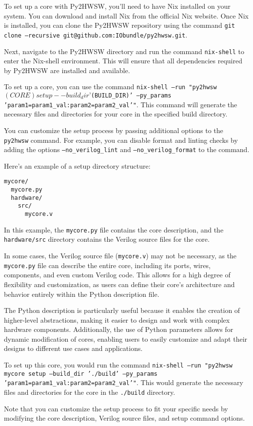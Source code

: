 %

To set up a core with Py2HWSW, you'll need to have Nix installed on your system. You can download and install Nix from the official Nix website. Once Nix is installed, you can clone the Py2HWSW repository using the command \texttt{git clone --recursive git@github.com:IObundle/py2hwsw.git}.

Next, navigate to the Py2HWSW directory and run the command \texttt{nix-shell} to enter the Nix-shell environment. This will ensure that all dependencies required by Py2HWSW are installed and available.

To set up a core, you can use the command \texttt{nix-shell --run "py2hwsw $(CORE) setup --build_dir ’$(BUILD_DIR)’ --py_params ’param1=param1_val:param2=param2_val’"}. This command will generate the necessary files and directories for your core in the specified build directory.

You can customize the setup process by passing additional options to the \texttt{py2hwsw} command. For example, you can disable format and linting checks by adding the options \texttt{--no_verilog_lint} and \texttt{--no_verilog_format} to the command.

Here's an example of a setup directory structure:
\begin{verbatim}
mycore/
  mycore.py
  hardware/
    src/
      mycore.v
\end{verbatim}
In this example, the \texttt{mycore.py} file contains the core description, and the \texttt{hardware/src} directory contains the Verilog source files for the core.

In some cases, the Verilog source file (\texttt{mycore.v}) may not be necessary, as the \texttt{mycore.py} file can describe the entire core, including its ports, wires, components, and even custom Verilog code. This allows for a high degree of flexibility and customization, as users can define their core's architecture and behavior entirely within the Python description file.

The Python description is particularly useful because it enables the creation of higher-level abstractions, making it easier to design and work with complex hardware components. Additionally, the use of Python parameters allows for dynamic modification of cores, enabling users to easily customize and adapt their designs to different use cases and applications.

To set up this core, you would run the command \texttt{nix-shell --run "py2hwsw mycore setup --build_dir ’./build’ --py_params ’param1=param1_val:param2=param2_val’"}. This would generate the necessary files and directories for the core in the \texttt{./build} directory.

Note that you can customize the setup process to fit your specific needs by modifying the core description, Verilog source files, and setup command options.

